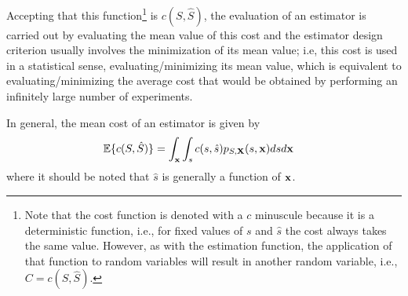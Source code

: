 Accepting that this function\footnote{Note that the cost function is denoted with a $c$ minuscule because it is a deterministic function, i.e., for fixed values of $s$ and $\hat s$ the cost always takes the same value. However, as with the estimation function, the application of that function to random variables will result in another random variable, i.e., $C = c(S,\hat S)$.}  is $c(S,\hat S)$, the evaluation of an estimator is carried out by evaluating the mean value of this cost and the estimator design criterion usually involves the minimization of its mean value; i.e, this cost is used in a statistical sense, evaluating/minimizing its mean value, which is equivalent to evaluating/minimizing the average cost that would be obtained by performing an infinitely large number of experiments.

In general, the mean cost of an estimator is given by
\begin{align}
\label{Est:coste_medio_gen}
\mathbb{E}\{c(S,\hat S)\} 
    & = \int_{\bf x} \int_s c(s,\hat s) p_{S,{\bf X}}(s,{\bf x}) ds d{\bf x}
\end{align}
where it should be noted that $\hat{s}$ is generally a function of ${\bf x}$.




